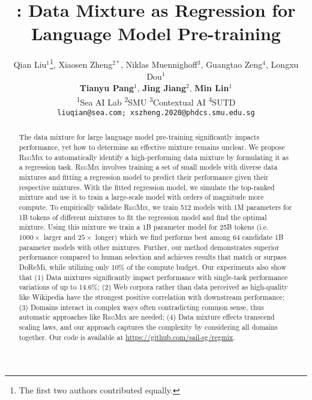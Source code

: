 \documentclass{article}
\title{\ourmethod: Data Mixture as Regression for\\Language Model Pre-training}
\author{%
Qian Liu$^{1}$\thanks{The first two authors contributed equally.}\;, Xiaosen Zheng$^{2*}$, Niklas Muennighoff$^3$, Guangtao Zeng$^4$, Longxu Dou$^1$\\
\textbf{Tianyu Pang}$^1$, \textbf{Jing Jiang}$^2$, \textbf{Min Lin}$^1$ \\
    \textsuperscript{1}Sea AI Lab  \quad \textsuperscript{2}SMU \quad \textsuperscript{3}Contextual AI \quad \textsuperscript{4}SUTD \\
    \texttt{liuqian@sea.com; xszheng.2020@phdcs.smu.edu.sg}
}
\theoremstyle{definition}
\theoremstyle{remark}
\newcommand{\ourmethod}{\textsc{RegMix}\xspace}
\begin{document}
\maketitle

\begin{abstract}
The data mixture for large language model pre-training significantly impacts performance, yet how to determine an effective mixture remains unclear. We propose \ourmethod to automatically identify a high-performing data mixture by formulating it as a regression task. \ourmethod involves training a set of small models with diverse data mixtures and fitting a regression model to predict their performance given their respective mixtures. With the fitted regression model, we simulate the top-ranked mixture and use it to train a large-scale model with orders of magnitude more compute. To empirically validate \ourmethod, we train 512 models with 1M parameters for 1B tokens of different mixtures to fit the regression model and find the optimal mixture. Using this mixture we train a 1B parameter model for 25B tokens (i.e. $1000 \times$ larger and $25 \times$ longer) which we find performs best among 64 candidate 1B parameter models with other mixtures. Further, our method demonstrates superior performance compared to human selection and achieves results that match or surpass DoReMi, while utilizing only 10\% of the compute budget. Our experiments also show that (1) Data mixtures significantly impact performance with single-task performance variations of up to 14.6\%; (2) Web corpora rather than data perceived as high-quality like Wikipedia have the strongest positive correlation with downstream performance; (3) Domains interact in complex ways often contradicting common sense, thus automatic approaches like \ourmethod are needed; (4) Data mixture effects transcend scaling laws, and our approach captures the complexity by considering all domains together. Our code is available at \url{https://github.com/sail-sg/regmix}.

\end{abstract}











\clearpage
\appendix



\end{document}
